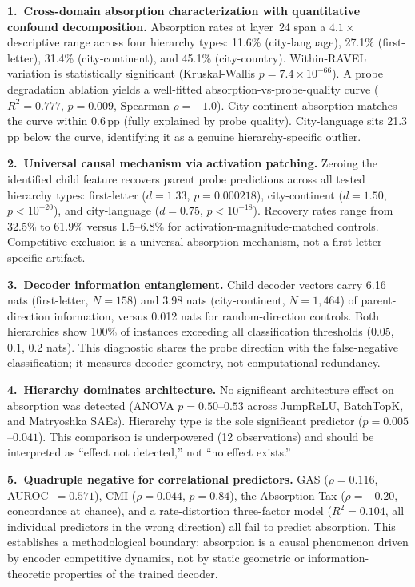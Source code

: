 \documentclass{article}
\begin{document}
\textbf{1.\ Cross-domain absorption characterization with quantitative confound decomposition.} Absorption rates at layer~24 span a $4.1\times$ descriptive range across four hierarchy types: 11.6\% (city-language), 27.1\% (first-letter), 31.4\% (city-continent), and 45.1\% (city-country). Within-RAVEL variation is statistically significant (Kruskal-Wallis $p = 7.4 \times 10^{-66}$). A probe degradation ablation yields a well-fitted absorption-vs-probe-quality curve ($R^2 = 0.777$, $p = 0.009$, Spearman $\rho = -1.0$). City-continent absorption matches the curve within 0.6\,pp (fully explained by probe quality). City-language sits 21.3\,pp below the curve, identifying it as a genuine hierarchy-specific outlier.

\textbf{2.\ Universal causal mechanism via activation patching.} Zeroing the identified child feature recovers parent probe predictions across all tested hierarchy types: first-letter ($d = 1.33$, $p = 0.000218$), city-continent ($d = 1.50$, $p < 10^{-20}$), and city-language ($d = 0.75$, $p < 10^{-18}$). Recovery rates range from 32.5\% to 61.9\% versus 1.5--6.8\% for activation-magnitude-matched controls. Competitive exclusion is a universal absorption mechanism, not a first-letter-specific artifact.

\textbf{3.\ Decoder information entanglement.} Child decoder vectors carry 6.16 nats (first-letter, $N = 158$) and 3.98 nats (city-continent, $N = 1{,}464$) of parent-direction information, versus 0.012 nats for random-direction controls. Both hierarchies show 100\% of instances exceeding all classification thresholds (0.05, 0.1, 0.2 nats). This diagnostic shares the probe direction with the false-negative classification; it measures decoder geometry, not computational redundancy.

\textbf{4.\ Hierarchy dominates architecture.} No significant architecture effect on absorption was detected (ANOVA $p = 0.50$--$0.53$ across JumpReLU, BatchTopK, and Matryoshka SAEs). Hierarchy type is the sole significant predictor ($p = 0.005$--$0.041$). This comparison is underpowered (12 observations) and should be interpreted as ``effect not detected,'' not ``no effect exists.''

\textbf{5.\ Quadruple negative for correlational predictors.} GAS ($\rho = 0.116$, AUROC~$= 0.571$), CMI ($\rho = 0.044$, $p = 0.84$), the Absorption Tax ($\rho = -0.20$, concordance at chance), and a rate-distortion three-factor model ($R^2 = 0.104$, all individual predictors in the wrong direction) all fail to predict absorption. This establishes a methodological boundary: absorption is a causal phenomenon driven by encoder competitive dynamics, not by static geometric or information-theoretic properties of the trained decoder.
\end{document}
